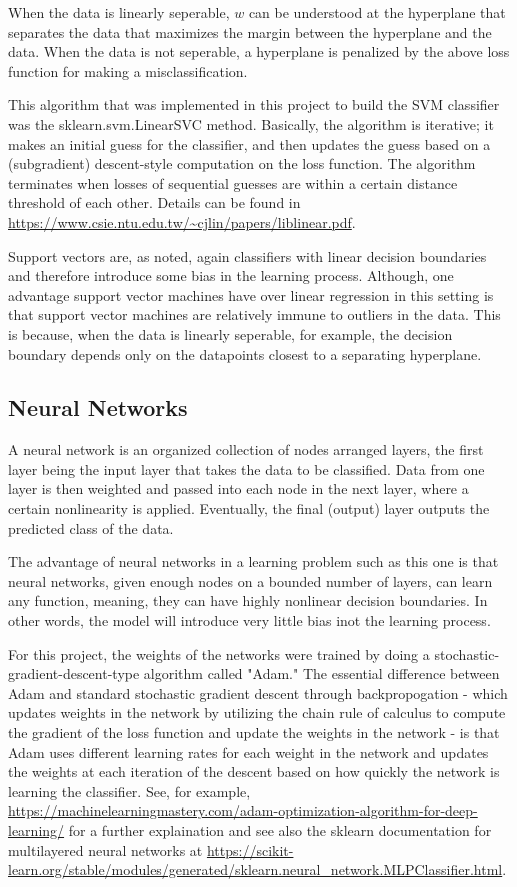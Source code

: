 \documentclass{article}
\begin{document}
When the data is linearly seperable, $w$ can be understood at the hyperplane that separates the data that maximizes the margin between the hyperplane and the data. When the data is not seperable, a hyperplane is penalized by the above loss function for making a misclassification. 

This algorithm that was implemented in this project to build the SVM classifier was the sklearn.svm.LinearSVC method. Basically, the algorithm is iterative; it makes an initial guess for the classifier, and then updates the guess based on a (subgradient) descent-style computation on the loss function. The algorithm terminates when losses of sequential guesses are within a certain distance threshold of each other. Details can be found in \url{https://www.csie.ntu.edu.tw/~cjlin/papers/liblinear.pdf}.

Support vectors are, as noted, again classifiers with linear decision boundaries and therefore introduce some bias in the learning process. Although, one advantage support vector machines have over linear regression in this setting is that support vector machines are relatively immune to outliers in the data. This is because, when the data is linearly seperable, for example, the decision boundary depends only on the datapoints closest to a separating hyperplane. 

\subsection{Neural Networks} A neural network is an organized collection of nodes arranged layers, the first layer being the input layer that takes the data to be classified. Data from one layer is then weighted and passed into each node in the next layer, where a certain nonlinearity is applied. Eventually, the final (output) layer outputs the predicted class of the data. 

The advantage of neural networks in a learning problem such as this one is that neural networks, given enough nodes on a bounded number of layers, can learn any function, meaning, they can have highly nonlinear decision boundaries. In other words, the model will introduce very little bias inot the learning process.

For this project, the weights of the networks were trained by doing a stochastic-gradient-descent-type algorithm called "Adam." The essential difference between Adam and standard stochastic gradient descent through backpropogation - which updates weights in the network by utilizing the chain rule of calculus to compute the gradient of the loss function and update the weights in the network -  is that Adam uses different learning rates for each weight in the network and updates the weights at each iteration of the descent based on how quickly the network is learning the classifier. See, for example, \url{https://machinelearningmastery.com/adam-optimization-algorithm-for-deep-learning/} for a further explaination and see also the sklearn documentation for multilayered neural networks at \url{https://scikit-learn.org/stable/modules/generated/sklearn.neural_network.MLPClassifier.html}.
\end{document}
